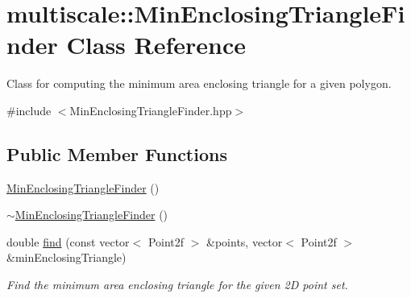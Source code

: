 \hypertarget{classmultiscale_1_1MinEnclosingTriangleFinder}{\section{multiscale\-:\-:\-Min\-Enclosing\-Triangle\-Finder \-Class \-Reference}
\label{classmultiscale_1_1MinEnclosingTriangleFinder}
}


\-Class for computing the minimum area enclosing triangle for a given polygon.  




{\ttfamily \#include $<$\-Min\-Enclosing\-Triangle\-Finder.\-hpp$>$}

\subsection*{\-Public \-Member \-Functions}
\begin{DoxyCompactItemize}
\item 
\hyperlink{classmultiscale_1_1MinEnclosingTriangleFinder_a9bac0668e32bcab3f35ddc81fea40940}{\-Min\-Enclosing\-Triangle\-Finder} ()
\item 
\hyperlink{classmultiscale_1_1MinEnclosingTriangleFinder_a356eccb6cce71d00144007df0bee1e5e}{$\sim$\-Min\-Enclosing\-Triangle\-Finder} ()
\item 
double \hyperlink{classmultiscale_1_1MinEnclosingTriangleFinder_afe74965c39261feb7152f5556c0281cd}{find} (const vector$<$ \-Point2f $>$ \&points, vector$<$ \-Point2f $>$ \&min\-Enclosing\-Triangle)
\begin{DoxyCompactList}\small\item\em \-Find the minimum area enclosing triangle for the given 2\-D point set. \end{DoxyCompactList}\end{DoxyCompactItemize}

